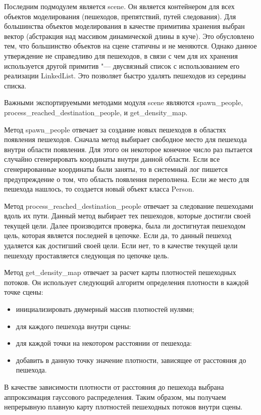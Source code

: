 Последним подмодулем является scene.
Он является контейнером для всех объектов моделирования (пешеходов, препятствий, путей следования).
Для большинства объектов моделирования в качестве примитива хранения выбран вектор (абстракция над массивом динамической длины в куче).
Это обусловлено тем, что большинство объектов на сцене статичны и не меняются.
Однако данное утверждение не справедливо для пешеходов, в связи с чем для их хранения используется другой примитив "---
двусвязный список с использованием его реализации LinkedList. Это позволяет быстро удалять пешеходов из середины списка.

Важными экспортируемыми методами модуля scene являются spa\-wn\_peo\-ple, pro\-cess\_reach\-ed\_des\-ti\-na\-ti\-on\_people, и get\_den\-si\-ty\_map.

Метод spawn\_people отвечает за создание новых пешеходов в областях появления пешеходов.
Сначала метод выбирает свободное место для пешехода внутри области появления.
Для этого он некоторое конечное число раз пытается случайно сгенерировать координаты внутри данной области.
Если все сгенерированные координаты были заняты, то в системный лог пишется предупреждение о том, что область появления переполнена.
Если же место для пешехода нашлось, то создается новый объект класса Person.

Метод process\_reached\_destination\_people отвечает за следование пешеходами вдоль их пути.
Данный метод выбирает тех пешеходов, которые достигли своей текущей цели.
Далее производится проверка, была ли достигнутая пешеходом цель, которая является последней в цепочке.
Если да, то данный пешеход удаляется как достигший своей цели. Если нет, то в качестве текущей цели пешеходу проставляется следующая по цепочке цель.

Метод get\_density\_map отвечает за расчет карты плотностей пешеходных потоков.
Он использует следующий алгоритм определения плотности в каждой точке сцены:
\begin{itemize}
  \item инициализировать двумерный массив плотностей нулями;
  \item для каждого пешехода внутри сцены:
  \item для каждой точки на некотором расстоянии от пешехода:
  \item добавить в данную точку значение плотности, зависящее от расстояния до пешехода.
\end{itemize}

В качестве зависимости плотности от расстояния до пешехода выбрана аппроксимация гауссового распределения.
Таким образом, мы получаем непрерывную плавную карту плотностей пешеходных потоков внутри сцены.

